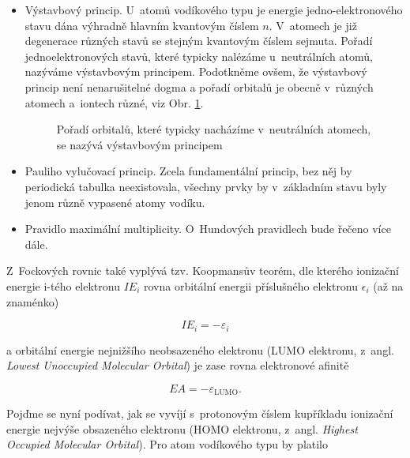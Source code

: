 \begin{itemize}
\item Výstavbový princip. U~atomů vodíkového typu je energie jedno-elektronového stavu dána výhradně hlavním kvantovým číslem $n$. V~atomech je již degenerace různých stavů se stejným kvantovým číslem sejmuta. Pořadí jednoelektronových stavů, které typicky nalézáme u~neutrálních atomů, nazýváme výstavbovým principem. Podotkněme ovšem, že výstavbový princip není nenarušitelné dogma a pořadí orbitalů je obecně v~různých atomech a~iontech různé, viz Obr. \ref{obr:Aufbau}.

\begin{figure} [ht]
\centering
\caption[Výstavbový princip]{Pořadí orbitalů, které typicky nacházíme v~neutrálních atomech, se nazývá výstavbovým principem}
\label{obr:Aufbau}
\end{figure}

\item Pauliho vylučovací princip. Zcela fundamentální princip, bez něj by periodická tabulka neexistovala, všechny prvky by v~základním stavu byly jenom různě vypasené atomy vodíku.

\item Pravidlo maximální multiplicity. O~Hundových pravidlech bude řečeno více dále.   
 
\end{itemize}

\noindent Z~Fockových rovnic také vyplývá tzv. Koopmansův teorém, dle kterého ionizační energie i-tého elektronu $IE_i$ rovna orbitální energii příslušného elektronu $\epsilon_i$ (až na znaménko) 

\begin{equation}
IE_i = - \varepsilon_i
\label{rov:VE-58}
\end{equation}

\noindent a orbitální energie nejnižšího neobsazeného elektronu (LUMO elektronu, z~angl. \textit{Lowest Unoccupied Molecular Orbital}) je zase rovna elektronové afinitě

\begin{equation}
EA = -\varepsilon_{\mathrm{LUMO}}.
\label{rov:VE-59}
\end{equation}

Pojďme se nyní podívat, jak se vyvíjí s~protonovým číslem kupříkladu ionizační energie nejvýše obsazeného elektronu (HOMO elektronu, z~angl. \textit{Highest Occupied Molecular Orbital}). Pro atom vodíkového typu by platilo

